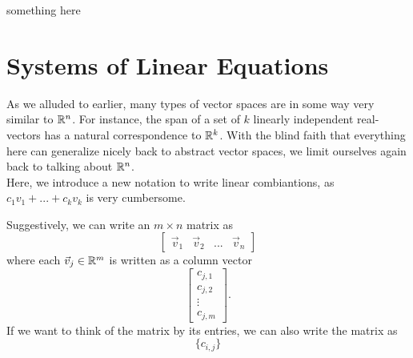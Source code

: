 \exercises
\begin{exerciselist}
	\item something here
\end{exerciselist}
\section{Systems of Linear Equations}
As we alluded to earlier, many types of vector spaces are in some way very similar to $\mathbb{R}^n$. For instance, the span of a set of $k$ linearly independent real-vectors has a natural correspondence to $\mathbb{R}^k$.
With the blind faith that everything here can generalize nicely back to abstract vector spaces, we limit ourselves again back to talking about $\mathbb{R}^n$.\\
Here, we introduce a new notation to write linear combiantions, as $c_1v_1+...+c_kv_k$ is very cumbersome.
\begin{notation}
	Suggestively, we can write an $m\times n$ matrix as \[
	\begin{bmatrix}
		\vec{v}_1 & \vec{v}_2 & ... & \vec{v}_n
	\end{bmatrix}
	\]
	where each $\vec{v}_j\in\mathbb{R}^m$ is written as a column vector\[
	\begin{bmatrix}
		c_{j,1} \\ c_{j,2}\\ \vdots \\ c_{j,m}
	\end{bmatrix}.
	\]
	If we want to think of the matrix by its entries, we can also write the matrix as \[
	\{c_{i,j}\}
	\]
\end{notation}
